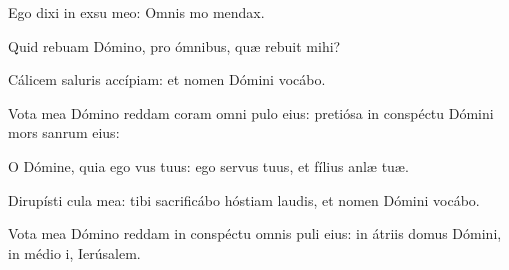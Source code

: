 \item {}

\item Ego dixi in exsu meo:\psstar{} Omnis mo mendax.

\item Quid rebuam Dómino,\psstar{} pro ómnibus, quæ rebuit mihi?

\item Cálicem saluris accípiam:\psstar{} et nomen Dómini vocábo.

\item Vota mea Dómino reddam coram omni pulo eius:\psstar{} pretiósa in conspéctu Dómini mors sanrum eius:

\item O Dómine, quia ego vus tuus:\psstar{} ego servus tuus, et fílius anlæ tuæ.

\item Dirupísti cula mea:\psstar{} tibi sacrificábo hóstiam laudis, et nomen Dómini vocábo.

\item Vota mea Dómino reddam in conspéctu omnis puli eius:\psstar{} in átriis domus Dómini, in médio i, Ierúsalem.
